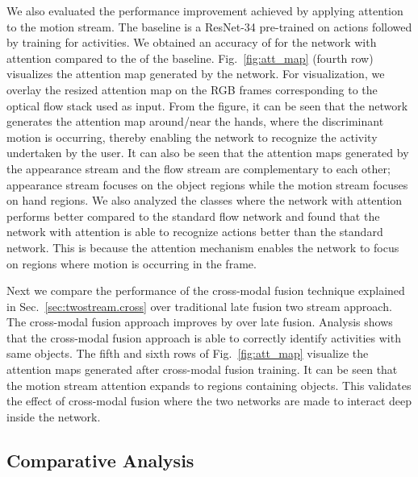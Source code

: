\documentclass[10pt,twocolumn,letterpaper]{article}
\begin{document}
\begin{matrix*}[r]
We also evaluated the performance improvement achieved by applying attention to the motion stream. The baseline is a ResNet-34 pre-trained on actions followed by training for activities. We obtained an accuracy of  for the network with attention compared to the  of the baseline. Fig.~\ref{fig:att_map} (fourth row) visualizes the attention map generated by the network. For visualization, we overlay the resized attention map on the RGB frames corresponding to the optical flow stack used as input. From the figure, it can be seen that the network generates the attention map around/near the hands, where the discriminant motion is occurring, thereby enabling the network to recognize the activity undertaken by the user. It can also be seen that the attention maps generated by the appearance stream and the flow stream are complementary to each other; appearance stream focuses on the object regions while the motion stream focuses on hand regions. We also analyzed the classes where the network with attention performs better compared to the standard flow network and found that the network with attention is able to recognize actions better than the standard network. This is because the attention mechanism enables the network to focus on regions where motion is occurring in the frame.

Next we compare the performance of the cross-modal fusion technique explained in Sec.~\ref{sec:twostream.cross} over traditional late fusion two stream approach. The cross-modal fusion approach improves by  over late fusion. Analysis shows that the cross-modal fusion approach is able to correctly identify activities with same objects. The fifth and sixth rows of Fig.~\ref{fig:att_map} visualize the attention maps generated after cross-modal fusion training. It can be seen that the motion stream attention expands to regions containing objects. This validates the effect of cross-modal fusion where the two networks are made to interact deep inside the network.



\subsection{Comparative Analysis}


\end{matrix*}
\end{document}
